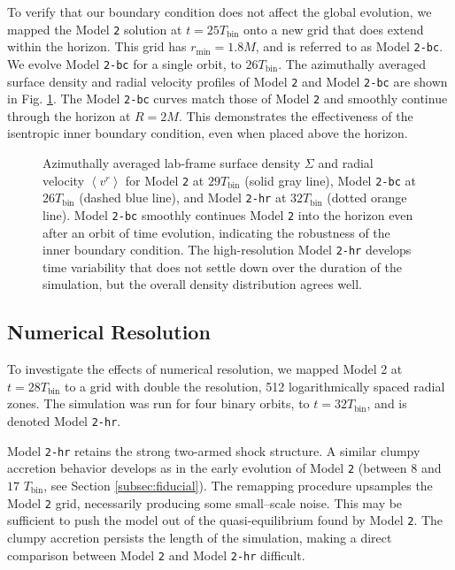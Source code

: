 \documentclass{emulateapj}
\newcommand{\model}[1]{{Model \texttt{#1}}}
\newcommand{\ave}[1]{\left \langle #1 \right \rangle}
\begin{document}
To verify that our boundary condition does not affect the global evolution, we mapped the \model{2} solution at $t=25 T_\text{bin}$ onto a new grid that does extend within the horizon.  This grid has $r_\text{min} = 1.8M$, and is referred to as \model{2-bc}.  We evolve \model{2-bc} for a single orbit, to $26T_\text{bin}$.  The azimuthally averaged surface density and radial velocity profiles of \model{2} and \model{2-bc} are shown in Fig. \ref{fi:bc_hr_comp}.  The \model{2-bc} curves match those of \model{2} and smoothly continue through the horizon at $R=2M$.  This demonstrates the effectiveness of the isentropic inner boundary condition, even when placed above the horizon.

\begin{figure}
	\caption{\label{fi:bc_hr_comp} Azimuthally averaged lab-frame surface density $\Sigma$ and radial velocity $\ave{v^r}$ for \model{2} at $29T_\text{bin}$ (solid gray line), \model{2-bc} at $26T_\text{bin}$ (dashed blue line), and \model{2-hr}  at $32T_\text{bin}$ (dotted orange line). \model{2-bc} smoothly continues \model{2} into the horizon even after an orbit of time evolution, indicating the robustness of the inner boundary condition.  The high-resolution \model{2-hr} develops time variability that does not settle down over the duration of the simulation, but the overall density distribution agrees well.}
\end{figure}

\subsection{Numerical Resolution}
\label{subsec:res}

To investigate the effects of numerical resolution, we mapped Model 2 at $t=28T_\text{bin}$ to a grid with double the resolution, 512 logarithmically spaced radial zones.  The simulation was run for four binary orbits, to $t = 32 T_\text{bin}$, and is denoted Model \texttt{2-hr}.

Model \texttt{2-hr} retains the strong two-armed shock structure. A similar clumpy accretion behavior develops as in the early evolution of \model{2} (between $8$ and $17$ $T_\text{bin}$, see Section \ref{subsec:fiducial}).  The remapping procedure upsamples the \model{2} grid, necessarily producing some small--scale noise.  This may be sufficient to push the model out of the quasi-equilibrium found by \model{2}. The clumpy accretion persists the length of the simulation, making a direct comparison between \model{2} and \model{2-hr} difficult.
\end{document}
